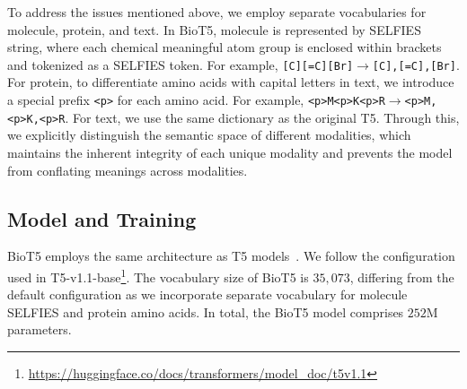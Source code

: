 \documentclass[11pt]{article}
\newcommand{\method}{{BioT5}}
\begin{document}
To address the issues mentioned above, we employ separate vocabularies for molecule, protein, and text.
In \method{}, molecule is represented by SELFIES string, where each chemical meaningful atom group is enclosed within brackets and tokenized as a SELFIES token.
For example, \texttt{[C][=C][Br]}$\rightarrow$\texttt{[C],[=C],[Br]}.
For protein, to differentiate amino acids with capital letters in text, we introduce a special prefix \texttt{<p>} for each amino acid. For example, \texttt{<p>M<p>K<p>R}$\rightarrow$\texttt{<p>M,<p>K,<p>R}.
For text, we use the same dictionary as the original T5.
Through this, we explicitly distinguish the semantic space of different modalities, which maintains the inherent integrity of each unique modality and prevents the model from conflating meanings across modalities.

\subsection{Model and Training}
\method{} employs the same architecture as T5 models~\citep{raffel2020exploring}.
We follow the configuration used in T5-v1.1-base\footnote{\url{https://huggingface.co/docs/transformers/model_doc/t5v1.1}}. 
The vocabulary size of \method{} is $35,073$,  differing from the default configuration as we incorporate separate vocabulary for molecule SELFIES and protein amino acids.
In total, the \method{} model comprises $252$M parameters.
\end{document}
